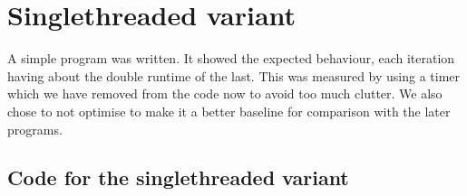 \section{Singlethreaded variant}
A simple program was written. It showed the expected behaviour, each iteration having about the double runtime of the last.
 This was  measured by using a timer     which we have removed from the code now to avoid too much clutter. We also chose to not optimise to make it a better baseline for comparison with the later programs. 
\subsection{Code for the singlethreaded variant}
\inputminted[tabsize=4]{c}{../SingleThread.c}